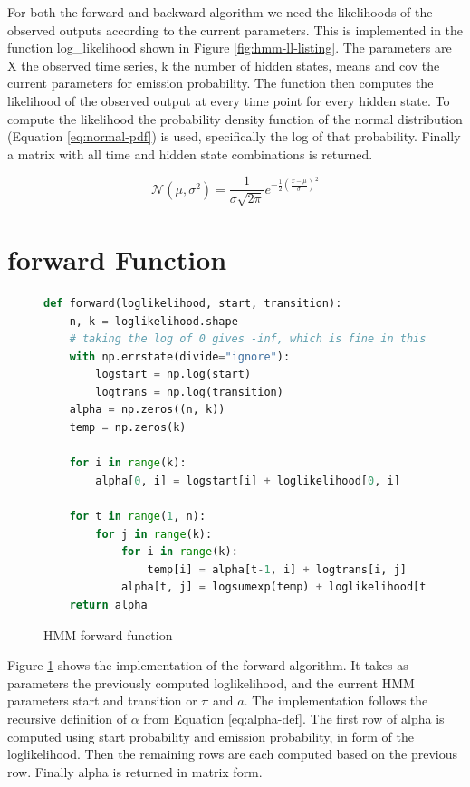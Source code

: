 For both the forward and backward algorithm we need the likelihoods of the observed outputs according to the current parameters. This is implemented in the function log\_likelihood shown in Figure \ref{fig:hmm-ll-listing}. The parameters are X the observed time series, k the number of hidden states, means and cov the current parameters for emission probability. The function then computes the likelihood of the observed output at every time point for every hidden state. To compute the likelihood the probability density function of the normal distribution (Equation \eqref{eq:normal-pdf}) is used, specifically the log of that probability. Finally a matrix with all time and hidden state combinations is returned. 

\begin{equation}
  \mathcal{N}\left(\mu, \sigma^{2}\right) = \frac{1}{\sigma \sqrt{2 \pi}} e^{-\frac{1}{2}\left(\frac{x-\mu}{\sigma}\right)^{2}} 
  \label{eq:normal-pdf}
\end{equation}

\section{forward Function}

\begin{figure}
\begin{singlespace}
\begin{lstlisting}[language=Python]
def forward(loglikelihood, start, transition):
    n, k = loglikelihood.shape
    # taking the log of 0 gives -inf, which is fine in this case
    with np.errstate(divide="ignore"):
        logstart = np.log(start)
        logtrans = np.log(transition)
    alpha = np.zeros((n, k))
    temp = np.zeros(k)

    for i in range(k):
        alpha[0, i] = logstart[i] + loglikelihood[0, i]

    for t in range(1, n):
        for j in range(k):
            for i in range(k):
                temp[i] = alpha[t-1, i] + logtrans[i, j]
            alpha[t, j] = logsumexp(temp) + loglikelihood[t, j]
    return alpha
\end{lstlisting}
\end{singlespace}
   
\caption{HMM forward function}    
\label{fig:hmm-forward-listing}
\end{figure}

Figure \ref{fig:hmm-forward-listing} shows the implementation of the forward algorithm. It takes as parameters the previously computed loglikelihood, and the current HMM parameters start and transition or $\pi$  and $a$. The implementation follows the recursive definition of $\alpha$ from Equation \eqref{eq:alpha-def}. The first row of alpha is computed using start probability and emission probability, in form of the loglikelihood. Then the remaining rows are each computed based on the previous row. Finally alpha is returned in matrix form. 

